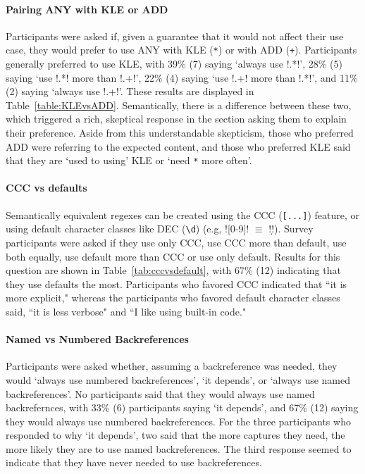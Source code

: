 \paragraph{Pairing ANY with KLE or ADD}  Participants were asked if, given a guarantee that it would not affect their use case, they would prefer to use ANY with KLE (\verb!*!) or with ADD (\verb!+!).  Participants generally preferred to use KLE, with 39\% (7) saying `always use \cverb!.*!', 28\% (5) saying `use \cverb!.*! more than \cverb!.+!', 22\% (4) saying `use \cverb!.+! more than \cverb!.*!', and 11\% (2) saying  `always use \cverb!.+!'.  These results are displayed in Table~\ref{table:KLEvsADD}.
Semantically, there is a difference between these two, which triggered a rich, skeptical response in the section asking them to explain their preference.  Aside from this understandable skepticism, those who preferred ADD were referring to the expected content, and those who preferred KLE said that they are `used to using' KLE or `need \verb!*! more often'.



\paragraph{CCC vs defaults} Semantically equivalent regexes can be created using the CCC (\verb![...]!) feature, or using default character classes like DEC (\verb!\d!) (e.g, \cverb![0-9]! $\equiv$ \cverb!\d!).  Survey participants were asked if they use only CCC, use CCC more than default, use both equally, use default more than CCC or use only default.  Results for this question are shown in Table~\ref{tab:cccvsdefault}, with 67\% (12) indicating that they use defaults the most.
Participants who favored CCC indicated that ``it is more explicit," whereas the participants who favored default character classes said,  ``it is less verbose" and ``I like using built-in code."

\paragraph{Named vs Numbered Backreferences}  Participants were asked whether, assuming a backreference was needed, they would `always use numbered backreferences', `it depends', or  `always use named backreferences'.  No participants said that they would always use named backrefernces, with 33\% (6) participants saying `it depends', and 67\% (12) saying they would always use numbered backreferences.  For the three participants who responded to why `it depends', two said that the more captures they need, the more likely they are to use named backreferences.  The third response seemed to indicate that they have never needed to use backreferences.

